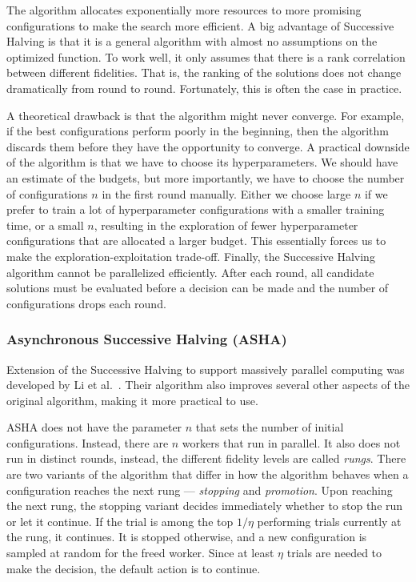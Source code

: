 The algorithm allocates exponentially more resources to more promising configurations to make the search more efficient. A big advantage of Successive Halving is that it is a general algorithm with almost no assumptions on the optimized function. To work well, it only assumes that there is a rank correlation between different fidelities. That is, the ranking of the solutions does not change dramatically from round to round. Fortunately, this is often the case in practice.

A theoretical drawback is that the algorithm might never converge. For example, if the best configurations perform poorly in the beginning, then the algorithm discards them before they have the opportunity to converge. A practical downside of the algorithm is that we have to choose its hyperparameters. We should have an estimate of the budgets, but more importantly, we have to choose the number of configurations $n$ in the first round manually. Either we choose large $n$ if we prefer to train a lot of hyperparameter configurations with a smaller training time, or a small $n$, resulting in the exploration of fewer hyperparameter configurations that are allocated a larger budget. This essentially forces us to make the exploration-exploitation trade-off. Finally, the Successive Halving algorithm cannot be parallelized efficiently. After each round, all candidate solutions must be evaluated before a decision can be made and the number of configurations drops each round.

\subsubsection{Asynchronous Successive Halving (ASHA)}
 Extension of the Successive Halving to support massively parallel computing was developed by Li et al.~\cite{li2020system}. Their algorithm also improves several other aspects of the original algorithm, making it more practical to use.

 ASHA does not have the parameter $n$ that sets the number of initial configurations. Instead, there are $n$ workers that run in parallel. It also does not run in distinct rounds, instead, the different fidelity levels are called \textit{rungs}. There are two variants of the algorithm that differ in how the algorithm behaves when a configuration reaches the next rung --- \textit{stopping} and \textit{promotion}. Upon reaching the next rung, the stopping variant decides immediately whether to stop the run or let it continue. If the trial is among the top $1/\eta$ performing trials currently at the rung, it continues. It is stopped otherwise, and a new configuration is sampled at random for the freed worker. Since at least $\eta$ trials are needed to make the decision, the default action is to continue.

